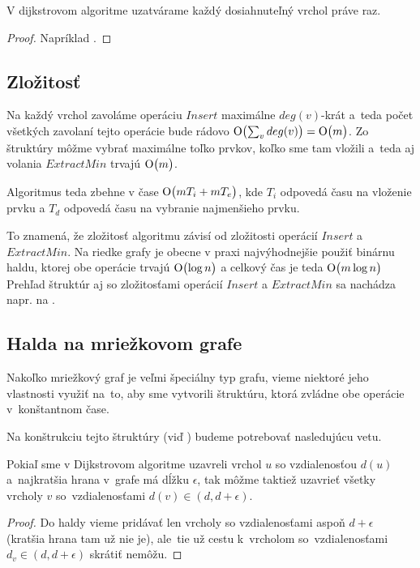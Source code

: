 \begin{theorem}
V dijkstrovom algoritme uzatvárame každý dosiahnuteľný vrchol práve raz.
\end{theorem}
\begin{proof}
Napríklad \cite{mares07}.
\end{proof}

\subsection{Zložitosť}
Na každý vrchol zavoláme operáciu $Insert$ maximálne $deg(v)$-krát a~teda počet všetkých zavolaní tejto operácie bude rádovo $\operatorname{O}\bigl(\sum_{v}{deg(v)}\bigr) = \operatorname{O}\bigl(m\bigr)$.
Zo štruktúry môžme vybrať maximálne toľko prvkov, koľko sme tam vložili a~teda aj volania $ExtractMin$ trvajú $\operatorname{O}\bigl(m\bigr)$.

Algoritmus teda zbehne v čase $\operatorname{O}\bigl(m T_i + m T_e\bigr)$, kde $T_i$ odpovedá času na vloženie prvku a $T_d$ odpovedá času na vybranie najmenšieho prvku.

To znamená, že zložitosť algoritmu závisí od zložitosti operácií $Insert$ a $ExtractMin$. Na riedke grafy je obecne v praxi najvýhodnejšie použiť 
binárnu haldu, ktorej obe operácie trvajú $\operatorname{O}\bigl(\log{n} \bigr) $ a celkový čas je teda $\operatorname{O}\bigl(m\log{n}\bigr)$
Prehľad štruktúr aj so zložitosťami operácií $Insert$ a $ExtractMin$ sa nachádza napr. na \cite{mares07}.

\subsection{Halda na mriežkovom grafe}
Nakoľko mriežkový graf je veľmi špeciálny typ grafu,
vieme niektoré jeho vlastnosti využiť na~to, aby sme vytvorili štruktúru, ktorá zvládne obe operácie v~konštantnom čase. 


Na konštrukciu tejto štruktúry (viď \cite{gs97}) budeme potrebovať nasledujúcu vetu.

\begin{theorem}
Pokiaľ sme v Dijkstrovom algoritme uzavreli vrchol $u$ so vzdialenosťou $d(u)$ a~najkratšia hrana v~grafe má dĺžku $\epsilon$, tak môžme taktiež 
uzavrieť všetky vrcholy $v$ so~vzdialenosťami $d(v) \in (d, d + \epsilon)$.
\end{theorem}
\begin{proof}
Do haldy vieme pridávať len vrcholy so vzdialenosťami aspoň $d + \epsilon$ (kratšia hrana tam už nie je), 
ale~tie už cestu k~vrcholom so~vzdialenosťami
$d_v \in (d, d + \epsilon)$ skrátiť nemôžu.
\end{proof}


